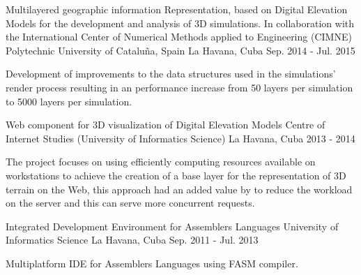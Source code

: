 \begin{cventries}

\cventry
{Multilayered geographic information Representation, based on Digital Elevation Models for the development and analysis of 3D simulations.} %
{In collaboration with the International Center of Numerical Methods applied to Engineering (CIMNE) Polytechnic University of Cataluña, Spain} %
{La Havana, Cuba} %
{Sep. 2014 - Jul. 2015} %
{ %
\begin{cvitems}
\item {Development of improvements to the data structures used in the simulations' render process resulting in an performance increase from 50 layers per simulation to 5000 layers per simulation.}
\end{cvitems}
}

\cventry
{Web component for 3D visualization of Digital Elevation Models} %
{Centre of Internet Studies (University of Informatics Science)} %
{La Havana, Cuba} %
{2013 - 2014} %
{ %
\begin{cvitems}
\item {The project focuses on using efficiently computing resources available on workstations to achieve the creation of a base layer for the representation of 3D terrain on the Web, this approach had an added value by to reduce the workload on the server and this can serve more concurrent requests.}
\end{cvitems}
}


\cventry
{Integrated Development Environment for Assemblers Languages} %
{University of Informatics Science} %
{La Havana, Cuba} %
{Sep. 2011 - Jul. 2013} %
{ %
\begin{cvitems}
\item {Multiplatform IDE for Assemblers Languages using FASM compiler.}
\end{cvitems}
}


\end{cventries}

